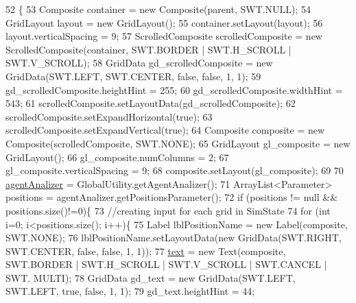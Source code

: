 \begin{DoxyCode}
52                                                 \{
53         Composite container = \textcolor{keyword}{new} Composite(parent, SWT.NULL);
54         GridLayout layout = \textcolor{keyword}{new} GridLayout();
55         container.setLayout(layout);
56         layout.verticalSpacing = 9;     
57         ScrolledComposite scrolledComposite = \textcolor{keyword}{new} ScrolledComposite(container, SWT.BORDER | SWT.H\_SCROLL | 
      SWT.V\_SCROLL);
58         GridData gd\_scrolledComposite = \textcolor{keyword}{new} GridData(SWT.LEFT, SWT.CENTER, \textcolor{keyword}{false}, \textcolor{keyword}{false}, 1, 1);
59         gd\_scrolledComposite.heightHint = 255;
60         gd\_scrolledComposite.widthHint = 543;
61         scrolledComposite.setLayoutData(gd\_scrolledComposite);
62         scrolledComposite.setExpandHorizontal(\textcolor{keyword}{true});
63         scrolledComposite.setExpandVertical(\textcolor{keyword}{true});      
64         Composite composite = \textcolor{keyword}{new} Composite(scrolledComposite, SWT.NONE);
65         GridLayout gl\_composite = \textcolor{keyword}{new} GridLayout();
66         gl\_composite.numColumns = 2;
67         gl\_composite.verticalSpacing = 9;
68         composite.setLayout(gl\_composite);
69         
70         \hyperlink{classit_1_1isislab_1_1masonhelperdocumentation_1_1mason_1_1wizards_1_1_e___agent_position_page_a2d464b9b75c99b576f5e23fc3b1d9c4a}{agentAnalizer} = GlobalUtility.getAgentAnalizer();      
71         ArrayList<Parameter> positions = agentAnalizer.getPositionsParameter(); 
72         \textcolor{keywordflow}{if} (positions != null && positions.size()!=0)\{
73             \textcolor{comment}{//creating input for each grid in SimState}
74             \textcolor{keywordflow}{for} (\textcolor{keywordtype}{int} i=0; i<positions.size(); i++)\{         
75                 Label lblPositionName = \textcolor{keyword}{new} Label(composite, SWT.NONE);
76                 lblPositionName.setLayoutData(\textcolor{keyword}{new} GridData(SWT.RIGHT, SWT.CENTER, \textcolor{keyword}{false}, \textcolor{keyword}{false}, 1, 1));
77                 \hyperlink{classit_1_1isislab_1_1masonhelperdocumentation_1_1mason_1_1wizards_1_1_e___agent_position_page_af6426f8de0e43846a74703addf28a63a}{text} = \textcolor{keyword}{new} Text(composite, SWT.BORDER | SWT.H\_SCROLL | SWT.V\_SCROLL | SWT.CANCEL | SWT.
      MULTI);
78                 GridData gd\_text = \textcolor{keyword}{new} GridData(SWT.LEFT, SWT.LEFT, \textcolor{keyword}{true}, \textcolor{keyword}{false}, 1, 1);
79                 gd\_text.heightHint = 44;

\end{DoxyCode}
